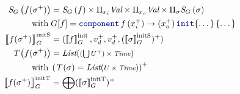 \begin{align}
    \stateTy{f(\sigma^+)}   & = \stateTy{f} \times \Pi_{x_i} \Val \times \Pi_{x_o} \Val \times \Pi_{\sigma} \stateTy{\sigma} \label{eq:semantics:grfrp:opsem:stateTy:op:app} \\
    \text{with} \;          & \G[f] = \component{f}{x_i^+}{x_o^+}{\dots}{\dots} \nonumber                                                                                    \\
    \initstate{f(\sigma^+)} & = (\initsync{f}, v_d^+, v_d^+, (\initstate{\sigma})^+) \label{eq:semantics:grfrp:opsem:init:op:app:state}                                      \\
    \timerTy{f(\sigma^+)}   & = \List{(\bigcup U^+) \times \Time} \label{eq:semantics:grfrp:opsem:timerTy:op:app}                                                            \\
    \text{with} \;          & \left(\timerTy{\sigma} = \List{U \times \Time}\right)^+ \nonumber                                                                              \\
    \inittimer{f(\sigma^+)} & = \bigLstconcat (\inittimer{\sigma})^+ \label{eq:semantics:grfrp:opsem:init:op:app:timer}
\end{align}

